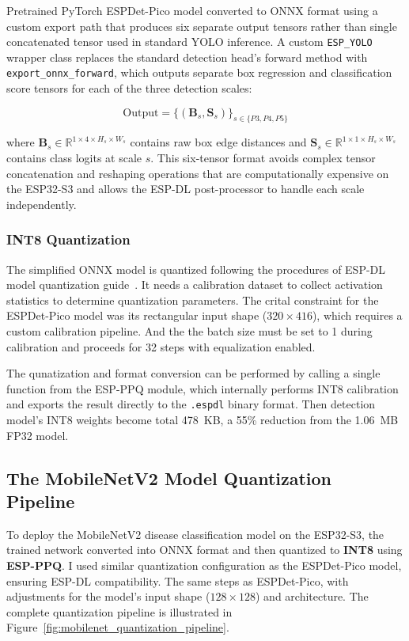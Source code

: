 Pretrained PyTorch ESPDet-Pico model converted to ONNX format using a custom export path that produces six separate output tensors rather than single concatenated tensor used in standard YOLO inference. A custom \texttt{ESP\_YOLO} wrapper class replaces the standard detection head's forward method with \texttt{export\_onnx\_forward}, which outputs separate box regression and classification score tensors for each of the three detection scales:

\begin{equation}
\text{Output} = \{(\mathbf{B}_s, \mathbf{S}_s)\}_{s \in \{P3, P4, P5\}}
\end{equation}

where $\mathbf{B}_s \in \mathbb{R}^{1 \times 4 \times H_s \times W_s}$ contains raw box edge distances and $\mathbf{S}_s \in \mathbb{R}^{1 \times 1 \times H_s \times W_s}$ contains class logits at scale $s$. This six-tensor format avoids complex tensor concatenation and reshaping operations that are computationally expensive on the ESP32-S3 and allows the ESP-DL post-processor to handle each scale independently.


\subsubsection*{INT8 Quantization}

The simplified ONNX model is quantized following the procedures of ESP-DL model quantization guide~\cite{esp_dl_mobilenetv2_tutorial}. It needs a calibration dataset to collect activation statistics to determine quantization parameters. The crital constraint for the ESPDet-Pico model was its rectangular input shape ($320 \times 416$), which requires a custom calibration pipeline. And the the batch size must be set to 1 during calibration and proceeds for 32 steps with equalization enabled. 

The qunatization and format conversion can be performed by calling a single function from the ESP-PPQ module, which internally performs INT8 calibration and exports the result directly to the \texttt{.espdl} binary format. Then detection model's INT8 weights become total 478~KB, a 55\% reduction from the 1.06~MB FP32 model.

\subsection{The MobileNetV2 Model Quantization Pipeline}
\label{subsec:mobilenet_quantization}
To deploy the MobileNetV2 disease classification model on the ESP32-S3, the trained network converted into ONNX format and then quantized to \textbf{INT8} using \textbf{ESP-PPQ}. I used similar quantization configuration as the ESPDet-Pico model, ensuring ESP-DL compatibility. The same steps as ESPDet-Pico, with adjustments for the model's input shape ($128 \times 128$) and architecture. The complete quantization pipeline is illustrated in Figure~\ref{fig:mobilenet_quantization_pipeline}.

